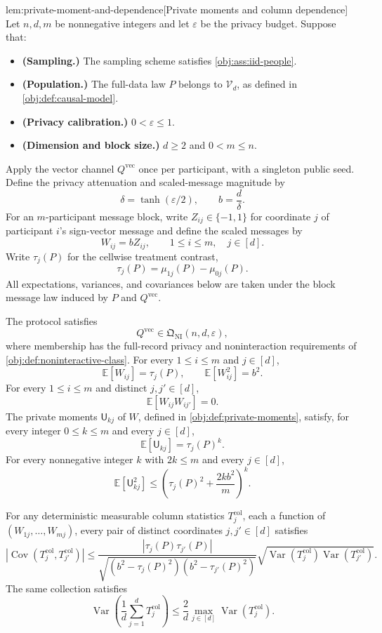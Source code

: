 \begin{lemmav}{lem:private-moment-and-dependence}[Private moments and column dependence]
Let \(n,d,m\) be nonnegative integers and let \(\varepsilon\) be the privacy budget. Suppose that:
\begin{itemize}
\item \textbf{(Sampling.)} The sampling scheme satisfies \cref{obj:ass:iid-people}.
\item \textbf{(Population.)} The full-data law \(P\) belongs to \(\mathcal V_d\), as defined in \cref{obj:def:causal-model}.
\item \textbf{(Privacy calibration.)} \(0<\varepsilon\le1\).
\item \textbf{(Dimension and block size.)} \(d\ge2\) and \(0<m\le n\).
\end{itemize}
Apply the vector channel \(Q^{\mathrm{vec}}\) once per participant, with a singleton public seed. Define the privacy attenuation and scaled-message magnitude by
\[
\delta=\tanh(\varepsilon/2),
\qquad
b=\frac d\delta.
\]
For an \(m\)-participant message block, write \(Z_{ij}\in\{-1,1\}\) for coordinate \(j\) of participant \(i\)'s sign-vector message and define the scaled messages by
\[
W_{ij}=bZ_{ij},
\qquad 1\le i\le m,\quad j\in[d].
\]
Write \(\tau_j(P)\) for the cellwise treatment contrast,
\[
\tau_j(P)=\mu_{1j}(P)-\mu_{0j}(P).
\]
All expectations, variances, and covariances below are taken under the block message law induced by \(P\) and \(Q^{\mathrm{vec}}\).

The protocol satisfies
\[
Q^{\mathrm{vec}}\in\mathfrak Q_{\mathrm{NI}}(n,d,\varepsilon),
\]
where membership has the full-record privacy and noninteraction requirements of \cref{obj:def:noninteractive-class}. For every \(1\le i\le m\) and \(j\in[d]\),
\[
\mathbb E[W_{ij}]=\tau_j(P),
\qquad
\mathbb E[W_{ij}^{2}]=b^{2}.
\]
For every \(1\le i\le m\) and distinct \(j,j'\in[d]\),
\[
\mathbb E[W_{ij}W_{ij'}]=0.
\]
The private moments \(\mathsf U_{kj}\) of \(W\), defined in \cref{obj:def:private-moments}, satisfy, for every integer \(0\le k\le m\) and every \(j\in[d]\),
\[
\mathbb E[\mathsf U_{kj}]=\tau_j(P)^k.
\]
For every nonnegative integer \(k\) with \(2k\le m\) and every \(j\in[d]\),
\[
\mathbb E[\mathsf U_{kj}^{2}]
\le
\left(\tau_j(P)^2+\frac{2kb^2}{m}\right)^k.
\]

For any deterministic measurable column statistics \(T_j^{\mathrm{col}}\), each a function of \((W_{1j},\ldots,W_{mj})\), every pair of distinct coordinates \(j,j'\in[d]\) satisfies
\[
\left|\operatorname{Cov}
\left(T_j^{\mathrm{col}},T_{j'}^{\mathrm{col}}\right)\right|
\le
\frac{|\tau_j(P)\tau_{j'}(P)|}
{\sqrt{(b^2-\tau_j(P)^2)(b^2-\tau_{j'}(P)^2)}}
\sqrt{\operatorname{Var}(T_j^{\mathrm{col}})
      \operatorname{Var}(T_{j'}^{\mathrm{col}})}.
\]
The same collection satisfies
\[
\operatorname{Var}\left(\frac1d\sum_{j=1}^{d}T_j^{\mathrm{col}}\right)
\le
\frac2d\max_{j\in[d]}\operatorname{Var}(T_j^{\mathrm{col}}).
\]
\end{lemmav}

